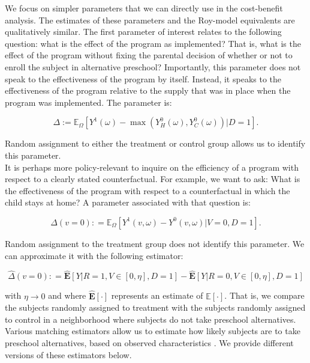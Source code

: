 \noindent We focus on simpler parameters that we can directly use in the cost-benefit analysis. The estimates of these parameters and the Roy-model equivalents are qualitatively similar. The first parameter of interest relates to the following question: what is the effect of the program as implemented? That is, what is the effect of the program without fixing the parental decision of whether or not to enroll the subject in alternative preschool? Importantly, this parameter does not speak to the effectiveness of the program by itself. Instead, it speaks to the effectiveness of the program relative to the supply that was in place when the program was implemented. The parameter is: 

\begin{equation}
\Delta := \mathbb{E}_{\Omega} \left[ Y^1 \left( \omega \right) -  \max \left(  Y_{H}^0 \left( \omega \right) ,  Y_{C}^0 \left( \omega \right)  \right) | D =1 \right]. \label{eq:mainest}
\end{equation}

\noindent Random assignment to either the treatment or control group allows us to identify this parameter.\\ 

\noindent It is perhaps more policy-relevant to inquire on the efficiency of a program with respect to a clearly stated counterfactual. For example, we want to ask: What is the effectiveness of the program with respect to a counterfactual in which the child stays at home? A parameter associated with that question is: 

\begin{equation}
\Delta \left( v = 0 \right) : =   \mathbb{E}_{\Omega} \left[ Y^1 \left( v, \omega \right) - Y^0 \left( v, \omega \right) | V = 0, D = 1 \right]. \label{eq:par0}
\end{equation}

\noindent Random assignment to the treatment group does not identify this parameter. We can approximate it with the following estimator: 

\begin{equation}
\widehat{\Delta} \left( v = 0 \right) : = \widehat{\mathbf{E}} \left[ Y | R = 1, V \in \left[ 0 , \eta \right], D = 1 \right] - \widehat{\mathbf{E}} \left[ Y | R = 0, V \in \left[ 0 , \eta \right], D = 1 \right] \label{eq:estimates0}
\end{equation}

\noindent with $\eta \rightarrow 0$ and where $\widehat{\mathbf{E}}[\cdot]$ represents an estimate of $\mathbb{E}[\cdot]$. That is, we compare the subjects randomly assigned to treatment with the subjects randomly assigned to control in a neighborhood where subjects do not take preschool alternatives. Various matching estimators allow us to estimate how likely subjects are to take preschool alternatives, based on observed characteristics \citep{Heckman_Ichimura_etal_1997_REStud,Heckman_Ichimura_etal_1998_REStud}. We provide different versions of these estimators below.\\

